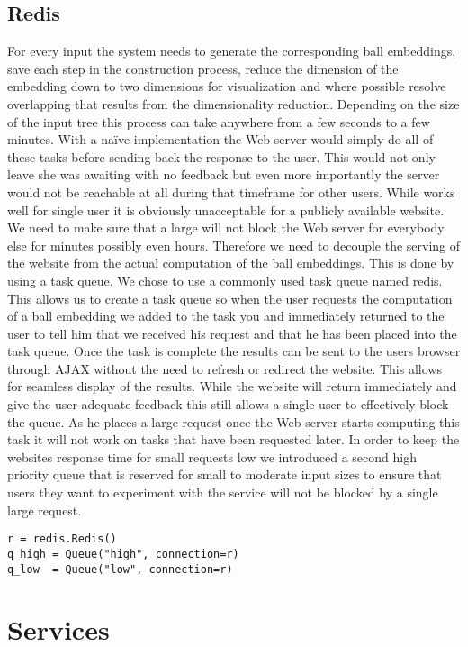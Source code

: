 \documentclass[]{article}
\begin{document}
\subsection{Redis}
For every input the system needs to generate the corresponding ball embeddings, save each step in the construction process, reduce the dimension of the embedding down to two dimensions for visualization and where possible resolve overlapping that results from the dimensionality reduction. Depending on the size of the input tree this process can take anywhere from a few seconds to a few minutes. With a naïve implementation the Web server would simply do all of these tasks before sending back the response to the user. This would not only leave she was awaiting with no feedback but even more importantly the server would not be reachable at all during that timeframe for other users. While works well for single user it is obviously unacceptable for a publicly available website. We need to make sure that a large will not block the Web server for everybody else for minutes possibly even hours. Therefore we need to decouple the serving of the website from the actual computation of the ball embeddings. This is done by using a task queue.
We chose to use a commonly used task queue named redis. This allows us to create a task queue so when the user requests the computation of a ball embedding we added to the task you and immediately returned to the user to tell him that we received his request and that he has been placed into the task queue. Once the task is complete the results can be sent to the users browser through AJAX without the need to refresh or redirect the website. This allows for seamless display of the results. While the website will return immediately and give the user adequate feedback this still allows a single user to effectively block the queue. As he places a large request once the Web server starts computing this task it will not work on tasks that have been requested later. In order to keep the websites response time for small requests low we introduced a second high priority queue that is reserved for small to moderate input sizes to ensure that users they want to experiment with the service will not be blocked by a single large request.
\begin{lstlisting}
r = redis.Redis()
q_high = Queue("high", connection=r)
q_low  = Queue("low", connection=r)  
\end{lstlisting}

\section{Services}
\end{document}
